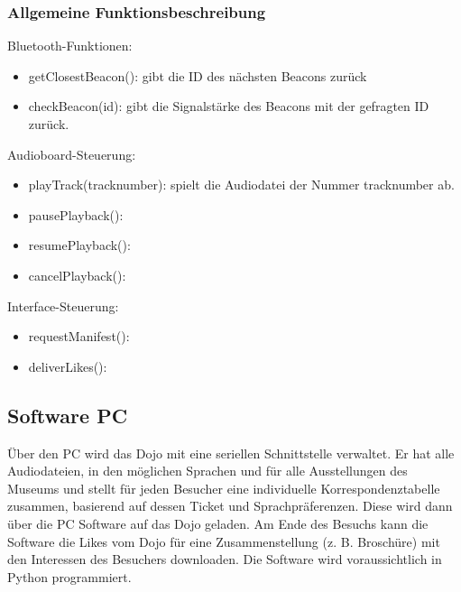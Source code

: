 \subsubsection{Allgemeine Funktionsbeschreibung}
Bluetooth-Funktionen:
\begin{itemize}
	\item getClosestBeacon(): gibt die ID des nächsten Beacons zurück
	\item checkBeacon(id): gibt die Signalstärke des Beacons mit der gefragten ID zurück.
\end{itemize}
\vspace*{0.2cm}
Audioboard-Steuerung:
\begin{itemize}
	\item playTrack(tracknumber): spielt die Audiodatei der Nummer tracknumber ab.
	\item pausePlayback():
	\item resumePlayback():
	\item cancelPlayback():
\end{itemize}
\vspace*{0.2cm}
Interface-Steuerung:
\begin{itemize}
	\item requestManifest():
	\item deliverLikes():
\end{itemize}

\subsection{Software PC}
Über den PC wird das Dojo mit eine seriellen Schnittstelle verwaltet. Er hat alle Audiodateien, in den möglichen Sprachen und für alle Ausstellungen des Museums und stellt für jeden Besucher eine individuelle Korrespondenztabelle zusammen, basierend auf dessen Ticket und Sprachpräferenzen. Diese wird dann über die PC Software auf das Dojo geladen. Am Ende des Besuchs kann die Software die Likes vom Dojo für eine Zusammenstellung (z. B. Broschüre) mit den Interessen des Besuchers downloaden. Die Software wird voraussichtlich in Python programmiert.\\
\newpage
